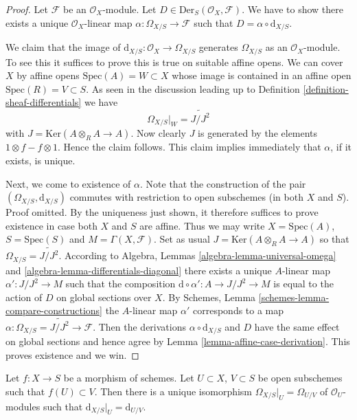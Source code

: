 \begin{proof}
Let $\mathcal{F}$ be an $\mathcal{O}_X$-module.
Let $D \in \text{Der}_S(\mathcal{O}_X, \mathcal{F})$.
We have to show there exists a unique $\mathcal{O}_X$-linear
map $\alpha : \Omega_{X/S} \to \mathcal{F}$ such that
$D = \alpha \circ \text{d}_{X/S}$.

\medskip\noindent
We claim that the image of $\text{d}_{X/S} : \mathcal{O}_X \to \Omega_{X/S}$
generates $\Omega_{X/S}$ as an $\mathcal{O}_X$-module. To see this it
suffices to prove this is true on suitable affine opens.
We can cover $X$ by affine opens $\text{Spec}(A) = W \subset X$
whose image is contained in an affine open $\text{Spec}(R) = V \subset S$.
As seen in the discussion leading up to
Definition \ref{definition-sheaf-differentials}
we have
$$
\Omega_{X/S}|_W = \widetilde{J/J^2}
$$
with $J = \text{Ker}(A \otimes_R A \to A)$. Now clearly $J$ is generated
by the elements $1 \otimes f - f \otimes 1$. Hence the claim follows.
This claim implies immediately that $\alpha$, if it exists, is unique.

\medskip\noindent
Next, we come to existence of $\alpha$. Note that the construction of
the pair $(\Omega_{X/S}, \text{d}_{X/S})$ commutes with restriction
to open subschemes (in both $X$ and $S$). Proof omitted. By the uniqueness
just shown, it therefore suffices to prove existence in case both
$X$ and $S$ are affine. Thus we may write $X = \text{Spec}(A)$,
$S = \text{Spec}(S)$ and $M = \Gamma(X, \mathcal{F})$.
Set as usual $J = \text{Ker}(A \otimes_R A \to A)$ so that
$\Omega_{X/S} = \widetilde{J/J^2}$.
According to Algebra, Lemmas \ref{algebra-lemma-universal-omega} and
\ref{algebra-lemma-differentials-diagonal}
there exists a unique $A$-linear map
$\alpha' : J/J^2 \to M$ such that the composition
$\text{d} \circ \alpha' : A \to J/J^2 \to M$
is equal to the action of $D$ on global sections over $X$.
By Schemes, Lemma \ref{schemes-lemma-compare-constructions} the $A$-linear map
$\alpha'$ corresponds to a map
$\alpha : \Omega_{X/S} = \widetilde{J/J^2} \to \mathcal{F}$.
Then the derivations $\alpha \circ \text{d}_{X/S}$ and $D$
have the same effect on global sections and hence agree
by Lemma \ref{lemma-affine-case-derivation}.
This proves existence and we win.
\end{proof}

\begin{lemma}
\label{lemma-differentials-restrict-open}
Let $f : X \to S$ be a morphism of schemes.
Let $U \subset X$, $V \subset S$ be open subschemes such
that $f(U) \subset V$. Then there is a unique isomorphism
$\Omega_{X/S}|_U = \Omega_{U/V}$ of $\mathcal{O}_U$-modules such that
$\text{d}_{X/S}|_U = \text{d}_{U/V}$.
\end{lemma}

